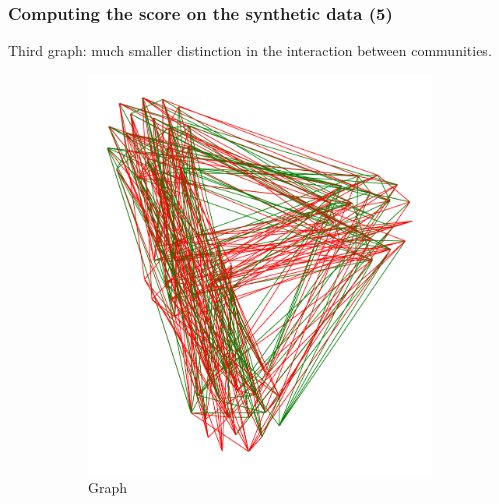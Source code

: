 \documentclass{beamer}
\begin{document}
\begin{frame}[c]
	\frametitle{Computing the score on the synthetic data (5)}
	Third graph: much smaller distinction in the interaction between
	communities.

	\begin{figure}
		\begin{center}
			\begin{subfigure}[b]{0.3\textwidth}
				\centering
				\includegraphics[width=\textwidth]{out/synthetic/model2_graph2.pdf}
				\caption{Graph}
				\label{fig:}
			\end{subfigure}
			\begin{subfigure}[b]{0.3\textwidth}
				\centering

\end{subfigure}
\end{center}
\end{figure}
\end{frame}
\end{document}
